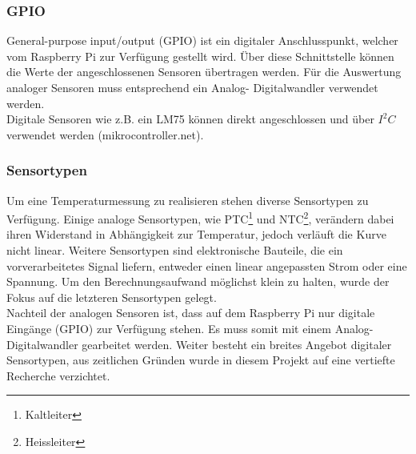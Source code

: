 \subsubsection{GPIO}
General-purpose input/output (GPIO) ist ein digitaler Anschlusspunkt, welcher vom Raspberry Pi zur Verfügung gestellt wird. Über diese Schnittstelle können die Werte der angeschlossenen Sensoren übertragen werden. Für die Auswertung analoger Sensoren muss entsprechend ein Analog- Digitalwandler verwendet werden.\\
Digitale Sensoren wie z.B. ein LM75 können direkt angeschlossen und über $I^2C$ verwendet werden (mikrocontroller.net).

\subsubsection{Sensortypen}
Um eine Temperaturmessung zu realisieren stehen diverse Sensortypen zu Verfügung. Einige analoge Sensortypen, wie PTC\footnote{Kaltleiter} und NTC\footnote{Heissleiter}, verändern dabei ihren Widerstand in Abhängigkeit zur Temperatur, jedoch verläuft die Kurve nicht linear. Weitere Sensortypen sind elektronische Bauteile, die ein vorverarbeitetes Signal liefern, entweder einen linear angepassten Strom oder eine Spannung. Um den Berechnungsaufwand möglichst klein zu halten, wurde der Fokus auf die letzteren Sensortypen gelegt.\\
Nachteil der analogen Sensoren ist, dass auf dem Raspberry Pi nur digitale Eingänge (GPIO) zur Verfügung stehen. Es muss somit  mit einem Analog- Digitalwandler gearbeitet werden.
Weiter besteht ein breites Angebot digitaler Sensortypen, aus zeitlichen Gründen wurde in diesem Projekt auf eine vertiefte Recherche verzichtet.

